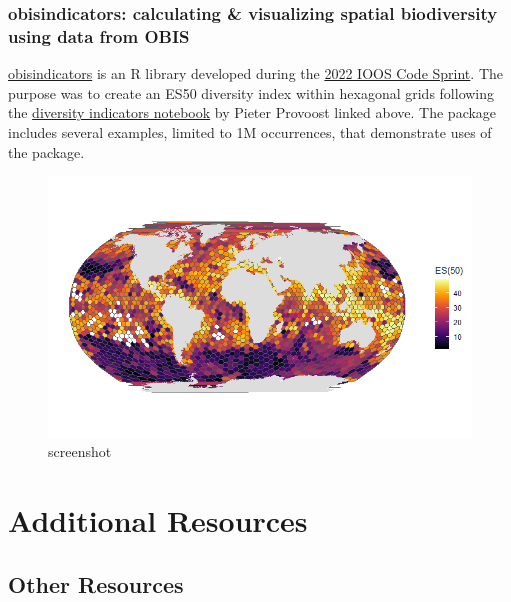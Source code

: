 \documentclass[
  letterpaper,
  DIV=11,
  numbers=noendperiod,
  oneside]{scrreprt}
\begin{document}
\hypertarget{obisindicators-calculating-visualizing-spatial-biodiversity-using-data-from-obis}{%
\section{obisindicators: calculating \& visualizing spatial biodiversity
using data from
OBIS}\label{obisindicators-calculating-visualizing-spatial-biodiversity-using-data-from-obis}}

\href{https://marinebon.org/obisindicators/index.html}{obisindicators}
is an R library developed during the
\href{https://ioos.github.io/ioos-code-sprint/}{2022 IOOS Code Sprint}.
The purpose was to create an ES50 diversity index within hexagonal grids
following the
\href{https://iobis.github.io/notebook-diversity-indicators/}{diversity
indicators notebook} by Pieter Provoost linked above. The package
includes several examples, limited to 1M occurrences, that demonstrate
uses of the package.

\begin{figure}

{\centering \includegraphics{./images/all_data.png}

}

\caption{screenshot}

\end{figure}

\part{Additional Resources}

\hypertarget{other-resources}{%
\chapter{Other Resources}\label{other-resources}}
\end{document}
